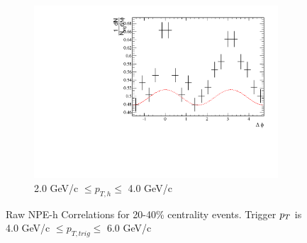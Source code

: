 \begin{figure}[htbp]
\begin{center}
\begin{subfigure}{0.5\textwidth}
		\includegraphics[width=\textwidth]{Plots/Correlations/raw/NPE_eh_corr_raw_primpt_4_5_cent_4_5_assopt_3_4.pdf}
		\caption{2.0 GeV/c $\leq p_{T,h} \leq$ 4.0 GeV/c}
		\label{fig:Raw2040c}
	\end{subfigure}	
\end{center}
\caption[Raw Correlations 20-40\% Centrality]{Raw NPE-h Correlations for 20-40\% centrality events. Trigger $p_{T}$ is 4.0 GeV/c $\leq p_{T,trig} \leq$ 6.0 GeV/c}
\label{fig:Raw2040}
\end{figure}

